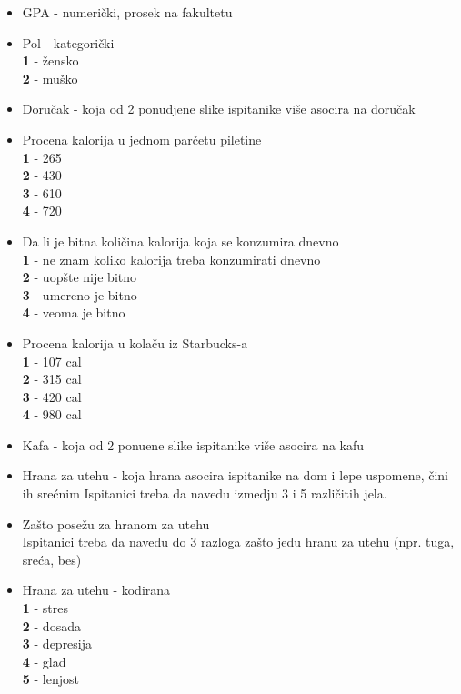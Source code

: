 \documentclass[12pt,a4paper]{article}
\begin{document}
\begin{itemize}
  \item GPA - numeri\v cki, prosek na fakultetu
  \item Pol - kategori\v cki\\
    \textbf{1} - \v zensko\\
    \textbf{2} - mu\v sko
  \item Doru\v cak - koja od 2 ponudjene slike ispitanike vi\v se asocira na doru\v cak
  \item Procena kalorija u jednom par\v cetu piletine\\
    \textbf{1} - 265\\ 
    \textbf{2} - 430\\
    \textbf{3} - 610\\
    \textbf{4} - 720
  \item Da li je bitna koli\v cina kalorija koja se konzumira dnevno\\
    \textbf{1} - ne znam koliko kalorija treba konzumirati dnevno\\
    \textbf{2} - uop\v ste nije bitno\\
    \textbf{3} - umereno je bitno\\
    \textbf{4} - veoma je bitno
  \item Procena kalorija u kola\v cu iz Starbucks-a\\
    \textbf{1} - 107 cal\\ 
    \textbf{2} - 315 cal\\ 
    \textbf{3} - 420 cal\\ 
    \textbf{4} - 980 cal
  \item Kafa - koja od 2 ponu\dj ene slike ispitanike vi\v se asocira na kafu
  \item Hrana za utehu - koja hrana asocira ispitanike na dom i lepe uspomene, \v cini ih sre\' cnim
    Ispitanici treba da navedu izmedju 3 i 5 razli\v citih jela.
  \item Za\v sto pose\v zu za hranom za utehu \\
    Ispitanici treba da navedu do 3 razloga za\v sto jedu hranu za utehu (npr. tuga, sre\' ca, bes)
  \item Hrana za utehu - kodirana\\
   \textbf{1} - stres\\
   \textbf{2} - dosada\\
   \textbf{3} - depresija\\
   \textbf{4} - glad\\
   \textbf{5} - lenjost\\

\end{itemize}
\end{document}
